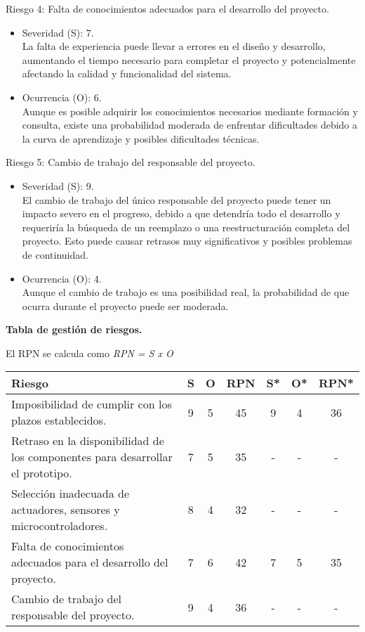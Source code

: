 Riesgo 4: Falta de conocimientos adecuados para el desarrollo del proyecto.
\begin{itemize}
	\item Severidad (S): 7.\\ La falta de experiencia puede llevar a errores en el diseño
	      y desarrollo, aumentando el tiempo necesario para completar el proyecto y
	      potencialmente afectando la calidad y funcionalidad del sistema.
	\item Ocurrencia (O): 6.\\ Aunque es posible adquirir los conocimientos necesarios
	      mediante formación y consulta, existe una probabilidad moderada de enfrentar
	      dificultades debido a la curva de aprendizaje y posibles dificultades técnicas.
\end{itemize}

Riesgo 5: Cambio de trabajo del responsable del proyecto.
\begin{itemize}
	\item Severidad (S): 9.\\ El cambio de trabajo del único responsable del proyecto
	      puede tener un impacto severo en el progreso, debido a que detendría todo el
	      desarrollo y requeriría la búsqueda de un reemplazo o una reestructuración
	      completa del proyecto. Esto puede causar retrasos muy significativos y posibles
	      problemas de continuidad.
	\item Ocurrencia (O): 4.\\ Aunque el cambio de trabajo es una posibilidad real, la
	      probabilidad de que ocurra durante el proyecto puede ser moderada.
\end{itemize}

\pagebreak

\textbf{Tabla de gestión de riesgos.}

El RPN se calcula como \textit{RPN = S x O}

\begin{table}[H]
	\centering
	\begin{tabularx}{\linewidth}{@{}|X|c|c|c|c|c|c|@{}}
		\hline
		\rowcolor[HTML]{C0C0C0}
		Riesgo                                                & S & O & RPN & S* & O* & RPN* \\ \hline
		Imposibilidad de cumplir con los plazos establecidos. & 9 & 5 & 45  & 9  & 4  & 36   \\ \hline
		Retraso en la disponibilidad de los componentes para
		desarrollar el prototipo.                             & 7 & 5 & 35  & -  & -  & -    \\ \hline
		Selección inadecuada de actuadores, sensores y
		microcontroladores.                                   & 8 & 4 & 32  & -  & -  & -    \\ \hline
		Falta de conocimientos adecuados para el desarrollo del
		proyecto.                                             & 7 & 6 & 42  & 7  & 5  & 35   \\ \hline
		Cambio de trabajo del responsable del proyecto.       & 9 & 4 & 36  & -  & -  & -    \\ \hline
	\end{tabularx}%
\end{table}

